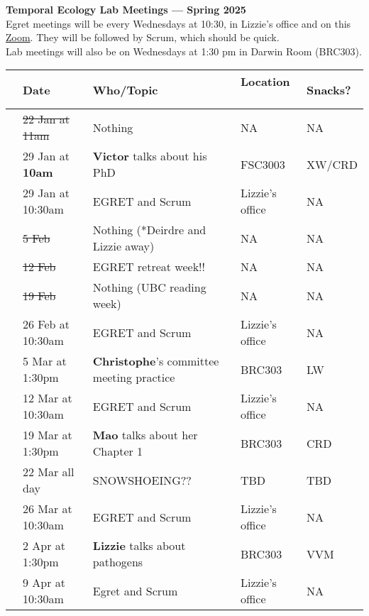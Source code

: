 \documentclass[11pt]{article}
\begin{document}
 
\raggedright
{}

\begin{center} 
{\large \textbf{Temporal Ecology Lab Meetings --- Spring 2025}} \\ [2pt]
Egret meetings will be every Wednesdays at 10:30, in Lizzie's office and on this  \href{https://ubc.zoom.us/j/61453894591?pwd=b2U5MTmUXtOCTKFlBW1s3pBMvHYWP9.1}{Zoom}. They will be followed by Scrum, which should be quick. 
\\ Lab meetings will also be on Wednesdays at 1:30 pm in Darwin Room (BRC303).\\ %
\end{center} 

\begin{center}
\begin{tabular}{ p{0.2 cm}  p{3.2 cm}  p{6 cm}  p{4 cm} p{1.5 cm} }  \hline \hline
 & \textbf{Date}
   & \textbf{Who/Topic}
      & \textbf{Location}  \
            & \textbf{Snacks?}  \\ 
\hline \hline
&\sout{22 Jan at 11am}& Nothing  & NA & NA \\\hline
&29 Jan at \textbf{10am} & \textbf{Victor} talks about his PhD & FSC3003 & XW/CRD \\\hline
&29 Jan at 10:30am & EGRET and Scrum & Lizzie's office & NA \\\hline
&\sout{5 Feb} & Nothing (*Deirdre and Lizzie away) &NA&NA\\\hline
&\sout{12 Feb} & EGRET retreat week!! & NA &NA \\\hline
&\sout{19 Feb} & Nothing (UBC reading week) &NA& NA \\\hline
&26 Feb at 10:30am & EGRET and Scrum & Lizzie's office & NA \\\hline
&5 Mar at 1:30pm & \textbf{Christophe}'s committee meeting practice  & BRC303 & LW \\\hline
&12 Mar at 10:30am & EGRET and Scrum& Lizzie's office  &NA \\\hline
&19 Mar at 1:30pm & \textbf{Mao} talks about her Chapter  1 & BRC303 &  CRD \\\hline
&22 Mar all day & SNOWSHOEING?? & TBD & TBD  \\\hline
&26 Mar at 10:30am & EGRET and Scrum& Lizzie's office  & NA \\\hline
&2 Apr at 1:30pm & \textbf{Lizzie} talks about pathogens & BRC303 & VVM \\\hline
&9 Apr at 10:30am & Egret and Scrum & Lizzie's office & NA \\\hline
\end{tabular}
\end{center}
\end{document}
